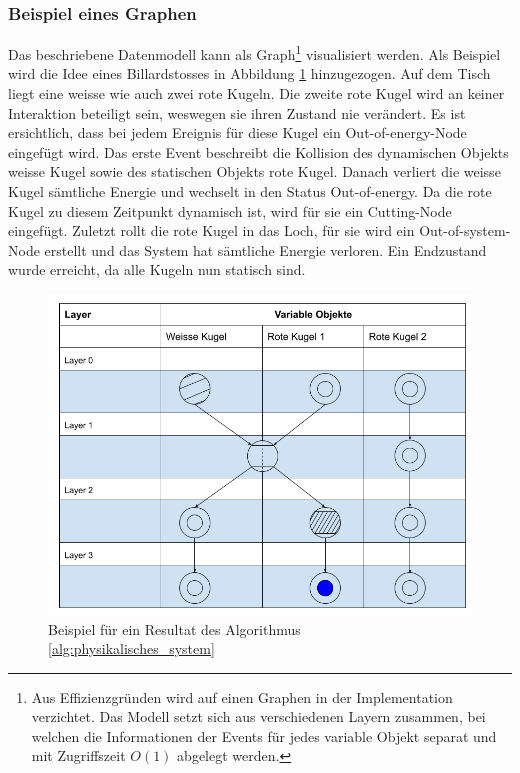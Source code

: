 \subsubsection{Beispiel eines Graphen}
Das beschriebene Datenmodell kann als Graph\footnote{Aus Effizienzgründen wird auf einen Graphen in der Implementation
verzichtet. Das Modell setzt sich aus verschiedenen Layern zusammen, bei welchen die Informationen der Events für jedes
variable Objekt separat und mit Zugriffszeit $O(1)$ abgelegt werden.} visualisiert werden. Als Beispiel wird die Idee
eines Billardstosses in Abbildung \ref{fig:Beispiel für ein Resultat des Algorithmus phys_sys} hinzugezogen.
Auf dem Tisch liegt eine weisse wie auch zwei rote Kugeln. Die zweite rote Kugel wird an keiner Interaktion beteiligt sein,
weswegen sie ihren Zustand nie verändert. Es ist ersichtlich, dass bei jedem Ereignis für diese Kugel ein \glqq Out-of-energy-Node\grqq{}
eingefügt wird.
Das erste Event beschreibt die Kollision des dynamischen Objekts \glqq weisse Kugel\grqq{} sowie des
statischen Objekts \glqq rote Kugel\grqq{}. Danach verliert die weisse Kugel sämtliche Energie und wechselt in den
Status \glqq Out-of-energy\grqq{}. Da die rote Kugel zu diesem Zeitpunkt dynamisch ist, wird für sie ein
\glqq Cutting-Node\grqq{} eingefügt. Zuletzt rollt die rote Kugel in das Loch, für sie wird ein \glqq Out-of-system-Node\grqq{}
erstellt und das System hat sämtliche Energie verloren. Ein Endzustand wurde erreicht, da alle Kugeln nun statisch sind.

\begin{figure}[h!]
    \begin{center}
        \includegraphics[width=0.6\linewidth]{../common/03_billiard_ai/resources/10_datenmodell_beispiel.png}
    \end{center}
    \caption{Beispiel für ein Resultat des Algorithmus \ref{alg:physikalisches_system}}
    \label{fig:Beispiel für ein Resultat des Algorithmus phys_sys}
\end{figure}

